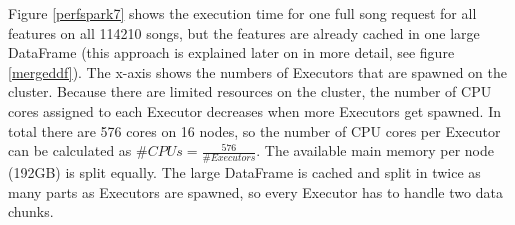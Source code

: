 \noindent Figure \ref{perfspark7} shows the execution time for one full song request for all features on all 114210 songs, but the features are already cached in one large DataFrame (this approach is explained later on in more detail, see figure \ref{mergeddf}).
The x-axis shows the numbers of Executors that are spawned on the cluster. Because there are limited resources on the cluster, the number of CPU cores assigned to each Executor decreases when more Executors get spawned. In total there are 576 cores on 16 nodes, so the number of CPU cores per Executor can be calculated as $\#CPUs = \frac{576}{\#Executors}$. The available main memory per node (192GB) is split equally. The large DataFrame is cached and split in twice as many parts as Executors are spawned, so every Executor has to handle two data chunks.


